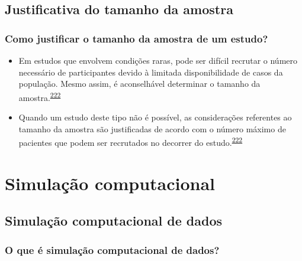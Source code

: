 \documentclass[
  a4paper,
]{book}
\begin{document}
\hypertarget{justificativa-do-tamanho-da-amostra}{%
\section{Justificativa do tamanho da amostra}\label{justificativa-do-tamanho-da-amostra}}

\hypertarget{como-justificar-o-tamanho-da-amostra-de-um-estudo}{%
\subsection{Como justificar o tamanho da amostra de um estudo?}\label{como-justificar-o-tamanho-da-amostra-de-um-estudo}}

\begin{itemize}
\item
  Em estudos que envolvem condições raras, pode ser difícil recrutar o número necessário de participantes devido à limitada disponibilidade de casos da população. Mesmo assim, é aconselhável determinar o tamanho da amostra.\textsuperscript{\protect\hyperlink{ref-rodruxedguezdeluxe1guila2014}{222}}
\item
  Quando um estudo deste tipo não é possível, as considerações referentes ao tamanho da amostra são justificadas de acordo com o número máximo de pacientes que podem ser recrutados no decorrer do estudo.\textsuperscript{\protect\hyperlink{ref-rodruxedguezdeluxe1guila2014}{222}}
\end{itemize}

\hypertarget{simulacao-computacional}{%
\chapter{\texorpdfstring{\textbf{Simulação computacional}}{Simulação computacional}}\label{simulacao-computacional}}

\hypertarget{simulacao-computacional-dados}{%
\section{Simulação computacional de dados}\label{simulacao-computacional-dados}}

\hypertarget{o-que-uxe9-simulauxe7uxe3o-computacional-de-dados}{%
\subsection{O que é simulação computacional de dados?}\label{o-que-uxe9-simulauxe7uxe3o-computacional-de-dados}}
\end{document}
